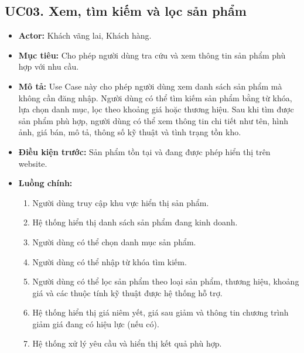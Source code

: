 \documentclass[12pt,a4paper]{article}
\begin{document}

\subsection{UC03. Xem, tìm kiếm và lọc sản phẩm}

\begin{itemize}

 \item \textbf{Actor:} Khách vãng lai, Khách hàng.

 \item \textbf{Mục tiêu:} Cho phép người dùng tra cứu và xem thông tin sản phẩm phù hợp với nhu cầu.

 \item \textbf{Mô tả:} Use Case này cho phép người dùng xem danh sách sản phẩm mà không cần đăng nhập. Người dùng có thể tìm kiếm sản phẩm bằng từ khóa, lựa chọn danh mục, lọc theo khoảng giá hoặc thương hiệu. Sau khi tìm được sản phẩm phù hợp, người dùng có thể xem thông tin chi tiết như tên, hình ảnh, giá bán, mô tả, thông số kỹ thuật và tình trạng tồn kho.

 \item \textbf{Điều kiện trước:} Sản phẩm tồn tại và đang được phép hiển thị trên website.

 \item \textbf{Luồng chính:}

 \begin{enumerate}

  \item Người dùng truy cập khu vực hiển thị sản phẩm.

  \item Hệ thống hiển thị danh sách sản phẩm đang kinh doanh.

  \item Người dùng có thể chọn danh mục sản phẩm.

  \item Người dùng có thể nhập từ khóa tìm kiếm.

  \item Người dùng có thể lọc sản phẩm theo loại sản phẩm, thương hiệu, khoảng giá và các thuộc tính kỹ thuật được hệ thống hỗ trợ.

  \item Hệ thống hiển thị giá niêm yết, giá sau giảm và thông tin chương trình giảm giá đang có hiệu lực (nếu có).

  \item Hệ thống xử lý yêu cầu và hiển thị kết quả phù hợp.


\end{enumerate}
\end{itemize}
\end{document}
